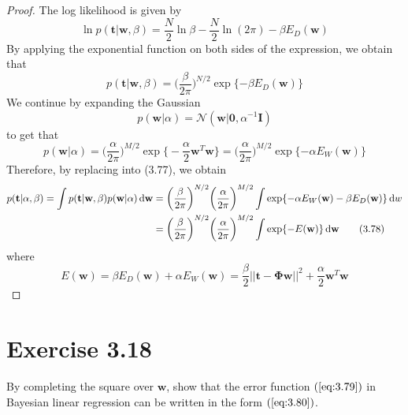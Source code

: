 \begin{proof}
    The log likelihood is given by
    \begin{equation}\label{eq:3.11}\tag{3.11}
        \ln p(\mathbf{t} | \mathbf{w}, \beta) 
        = \frac{N}{2} \ln \beta - \frac{N}{2} \ln(2\pi) - \beta E_D(\mathbf{w})
    \end{equation}
    By applying the exponential function on both sides of the expression, we obtain that
    \[
        p(\mathbf{t} | \mathbf{w}, \beta) 
        = \bigg(\frac{\beta}{2\pi}\bigg)^{N/2} \exp \{-\beta E_D(\mathbf{w})\}
    \] 
    We continue by expanding the Gaussian
    \begin{equation}\label{eq:3.52}\tag{3.52}
        p(\mathbf{w} | \alpha) = \mathcal{N}(\mathbf{w} | \mathbf{0}, \alpha^{-1} \mathbf{I})
    \end{equation}
    to get that
    \[
        p(\mathbf{w} | \alpha) 
        = \bigg(\frac{\alpha}{2\pi}\bigg)^{M / 2} 
            \exp\bigg\{-\frac{\alpha}{2} \mathbf{w}^T\mathbf{w}\bigg\}
        = \bigg(\frac{\alpha}{2\pi}\bigg)^{M / 2}  \exp\{-\alpha E_W(\mathbf{w})\}
    \] 
    Therefore, by replacing into (3.77), we obtain
    \begin{align*}
        p(\mathbf{t} | \alpha, \beta)
        = \int p(\mathbf{t} | \mathbf{w}, \beta) p(\mathbf{w} | \alpha) \mathop{}\!\mathrm{d} \mathbf{w}
        &= \bigg(\frac{\beta}{2\pi}\bigg)^{N/2} \bigg(\frac{\alpha}{2\pi}\bigg)^{M/2}
        \int \exp\{-\alpha E_W(\mathbf{w}) - \beta E_D(\mathbf{w})\} \mathop{}\!\mathrm{d} w \\
        &= \bigg(\frac{\beta}{2\pi}\bigg)^{N/2} \bigg(\frac{\alpha}{2\pi}\bigg)^{M/2}
        \int \exp\{-E(\mathbf{w})\} \mathop{}\!\mathrm{d} \mathbf{w} \label{eq:3.78} \tag{3.78}
    \end{align*}
    where
    \begin{equation}\label{eq:3.79}\tag{3.79}
        E(\mathbf{w}) 
        = \beta E_D(\mathbf{w}) + \alpha E_W(\mathbf{w})
        = \frac{\beta}{2} ||\mathbf{t} - \mathbf{\Phi}\mathbf{w}||^2 
        + \frac{\alpha}{2} \mathbf{w}^T\mathbf{w}
    \end{equation}
\end{proof}

\section*{Exercise 3.18}
By completing the square over $\mathbf{w}$, show that the error function
$(\ref{eq:3.79})$ in Bayesian linear regression can be written in the form
$(\ref{eq:3.80})$.

